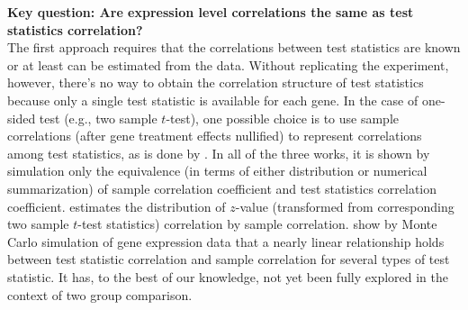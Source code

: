 \documentclass[12pt, a4paper]{article}
\begin{document}
	\textbf{Key question: Are  expression level correlations the same as test statistics correlation?}\\
	The first approach requires that the correlations between test statistics are known or at least can be estimated from the data. Without replicating the experiment, however, there's no way to obtain the correlation structure of test statistics because only a single test statistic is available for each gene. In the case of one-sided test (e.g., two sample $t$-test), one possible choice is to use sample correlations (after gene treatment effects nullified) to represent correlations among test statistics, as is done by \citet{barry2008statistical, efron2007correlation, wu2012camera}. 
	In all of the three works, it is shown by simulation only the
	equivalence (in terms of either distribution or numerical summarization) of sample correlation coefficient and test statistics correlation coefficient. 
	\citet{efron2007correlation} estimates the distribution of $z$-value (transformed from corresponding two sample $t$-test statistics) correlation by sample correlation. \citet{barry2008statistical} show by Monte Carlo simulation of gene expression data that a nearly linear relationship holds between test statistic correlation and sample correlation for several types of test statistic.
	 It has, to the best of our knowledge, not yet been fully explored in
	the context of two group comparison.
	
\end{document}
